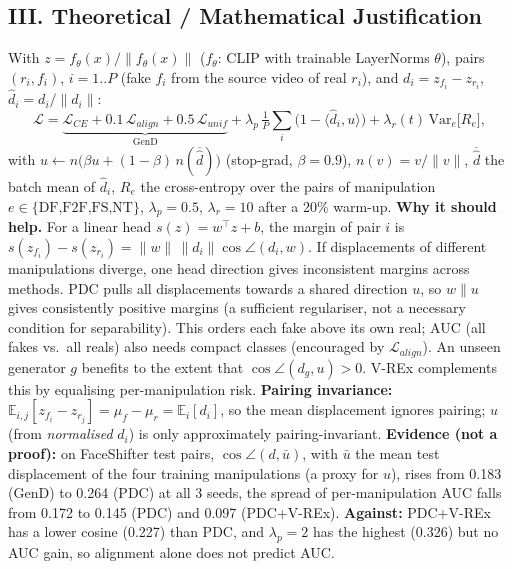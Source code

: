 \documentclass[8pt,a4paper]{article}
\begin{document}
\subsection*{III. Theoretical / Mathematical Justification}
With $z=f_\theta(x)/\|f_\theta(x)\|$ ($f_\theta$: CLIP with trainable LayerNorms $\theta$), pairs $(r_i,f_i)$, $i{=}1..P$ (fake $f_i$ from the source video of real $r_i$), and $d_i = z_{f_i}-z_{r_i}$, $\hat d_i=d_i/\|d_i\|$:
\[
\mathcal{L}=\underbrace{\mathcal{L}_{CE}+0.1\,\mathcal{L}_{align}+0.5\,\mathcal{L}_{unif}}_{\text{GenD}}
+\lambda_p\,\tfrac{1}{P}\textstyle\sum_i\big(1-\langle \hat d_i,u\rangle\big)
+\lambda_r(t)\,\mathrm{Var}_{e}\big[R_e\big],
\]
with $u\leftarrow n\big(\beta u+(1-\beta)\,n(\overline{\hat d})\big)$ (stop-grad, $\beta{=}0.9$), $n(v)=v/\|v\|$, $\overline{\hat d}$ the batch mean of $\hat d_i$, $R_e$ the cross-entropy over the pairs of manipulation $e\in\{\text{DF,F2F,FS,NT}\}$, $\lambda_p{=}0.5$, $\lambda_r{=}10$ after a 20\% warm-up.
\textbf{Why it should help.} For a linear head $s(z)=w^\top z+b$, the margin of pair $i$ is $s(z_{f_i})-s(z_{r_i})=\|w\|\,\|d_i\|\cos\angle(d_i,w)$. If displacements of different manipulations diverge, one head direction gives inconsistent margins across methods. PDC pulls all displacements towards a shared direction $u$, so $w\parallel u$ gives consistently positive margins (a sufficient regulariser, not a necessary condition for separability). This orders each fake above its own real; AUC (all fakes vs.\ all reals) also needs compact classes (encouraged by $\mathcal{L}_{align}$). An unseen generator $g$ benefits to the extent that $\cos\angle(d_g,u)>0$. V-REx complements this by equalising per-manipulation risk. \textbf{Pairing invariance:} $\mathbb{E}_{i,j}[z_{f_i}-z_{r_j}]=\mu_f-\mu_r=\mathbb{E}_i[d_i]$, so the mean displacement ignores pairing; $u$ (from \emph{normalised} $d_i$) is only approximately pairing-invariant. \textbf{Evidence (not a proof):} on FaceShifter test pairs, $\cos\angle(d,\bar u)$, with $\bar u$ the mean test displacement of the four training manipulations (a proxy for $u$), rises from 0.183 (GenD) to 0.264 (PDC) at all 3 seeds, the spread of per-manipulation AUC falls from 0.172 to 0.145 (PDC) and 0.097 (PDC+V-REx). \textbf{Against:} PDC+V-REx has a lower cosine (0.227) than PDC, and $\lambda_p{=}2$ has the highest (0.326) but no AUC gain, so alignment alone does not predict AUC.

\end{document}
